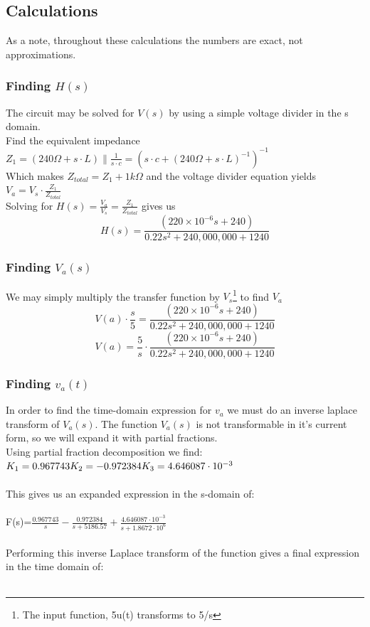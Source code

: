 \documentclass[11pt]{article}
\begin{document}
	
	\subsection*{Calculations}
	As a note, throughout these calculations the numbers are exact, not approximations. 
	\subsubsection*{Finding $H(s)$}
	The circuit may be solved for $V(s)$ by using a simple voltage divider in the s domain.\\ 
	Find the equivalent impedance $Z_1= (240 \Omega + s \cdot L) \parallel \frac{1}{s\cdot c} = (s\cdot c+(240 \Omega + s \cdot L)^{-1})^{-1}$ \\
	Which makes $Z_{total}=Z_1+1k\Omega$ and the voltage divider equation yields $V_a=V_s\cdot \frac{Z_1}{Z_{total}}$\\
	Solving for $H(s)=\frac{V_a}{V_s}=\frac{Z_1}{Z_{total}}$ gives us\\


	\[ H(s)= \frac{(220\times10^{-6}s+240)}{0.22s^{2}+240,000,000+1240} \]
	\subsubsection*{Finding $V_a(s)$}
	We may simply multiply the transfer function by $V_s$\footnote{The input function, 5u(t) transforms to 5/s} to find $V_a$\\
	\[ V(a) \cdot \frac{s}{5}= \frac{(220\times10^{-6}s+240)}{0.22s^{2}+240,000,000+1240} \]
	\[ V(a) =\frac{5}{s}\cdot\frac{(220\times10^{-6}s+240)}{0.22s^{2}+240,000,000+1240} \]
	\newpage
	\subsubsection*{Finding $v_a(t)$}
	In order to find the time-domain expression for $v_a$ we must do an inverse laplace transform of $V_a(s)$. The function $V_a(s)$ is not transformable in it's current form, so we will expand it with partial fractions.\\
	Using partial fraction decomposition we find:\\
	$K_{1}=0.967743\\
	K_{2}=-0.972384\\
	K_{3}=4.646087 \cdot10^{-3}$\\\\
	This gives us an expanded expression in the s-domain of:\\\\
	F(s)=$\frac{0.967743}{s}- \frac{0.972384}{s+5186.57}+\frac{4.646087\cdot10^{-3}}{s+1.8672\cdot10^{6}}$\\\\
	Performing this inverse Laplace transform of the function gives a final expression in the time domain of:\\\\
	
\end{document}
